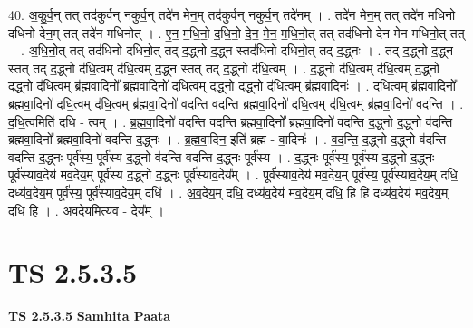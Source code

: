 \documentclass[17pt]{extarticle}
\begin{document}
40. अ॒कु॒र्व॒न् तत् तद॑कुर्वन् नकुर्व॒न् तदे॑न मेन॒म् तद॑कुर्वन् नकुर्व॒न् तदे॑नम् । . तदे॑न मेन॒म् तत् तदे॑न मधिनो दधिनो देन॒म् तत् तदे॑न मधिनोत् । . ए॒न॒ म॒धि॒नो॒ द॒धि॒नो॒ दे॒न॒ मे॒न॒ म॒धि॒नो॒त् तत् तद॑धिनो देन मेन मधिनो॒त् तत् । . अ॒धि॒नो॒त् तत् तद॑धिनो दधिनो॒त् तद् द॒द्ध्नो द॒द्ध्न स्तद॑धिनो दधिनो॒त् तद् द॒द्ध्नः । . तद् द॒द्ध्नो द॒द्ध्न स्तत् तद् द॒द्ध्नो द॑धि॒त्वम् द॑धि॒त्वम् द॒द्ध्न स्तत् तद् द॒द्ध्नो द॑धि॒त्वम् । . द॒द्ध्नो द॑धि॒त्वम् द॑धि॒त्वम् द॒द्ध्नो द॒द्ध्नो द॑धि॒त्वम् ब्र॑ह्मवा॒दिनो᳚ ब्रह्मवा॒दिनो॑ दधि॒त्वम् द॒द्ध्नो द॒द्ध्नो द॑धि॒त्वम् ब्र॑ह्मवा॒दिनः॑ । . द॒धि॒त्वम् ब्र॑ह्मवा॒दिनो᳚ ब्रह्मवा॒दिनो॑ दधि॒त्वम् द॑धि॒त्वम् ब्र॑ह्मवा॒दिनो॑ वदन्ति वदन्ति ब्रह्मवा॒दिनो॑ दधि॒त्वम् द॑धि॒त्वम् ब्र॑ह्मवा॒दिनो॑ वदन्ति । . द॒धि॒त्वमिति॑ दधि - त्वम् । . ब्र॒ह्म॒वा॒दिनो॑ वदन्ति वदन्ति ब्रह्मवा॒दिनो᳚ ब्रह्मवा॒दिनो॑ वदन्ति द॒द्ध्नो द॒द्ध्नो व॑दन्ति ब्रह्मवा॒दिनो᳚ ब्रह्मवा॒दिनो॑ वदन्ति द॒द्ध्नः । . ब्र॒ह्म॒वा॒दिन॒ इति॑ ब्रह्म - वा॒दिनः॑ । . व॒द॒न्ति॒ द॒द्ध्नो द॒द्ध्नो व॑दन्ति वदन्ति द॒द्ध्नः पूर्व॑स्य॒ पूर्व॑स्य द॒द्ध्नो व॑दन्ति वदन्ति द॒द्ध्नः पूर्व॑स्य । . द॒द्ध्नः पूर्व॑स्य॒ पूर्व॑स्य द॒द्ध्नो द॒द्ध्नः पूर्व॑स्याव॒देय॑ मव॒देय॒म् पूर्व॑स्य द॒द्ध्नो द॒द्ध्नः पूर्व॑स्याव॒देय᳚म् । . पूर्व॑स्याव॒देय॑ मव॒देय॒म् पूर्व॑स्य॒ पूर्व॑स्याव॒देय॒म् दधि॒ दध्य॑व॒देय॒म् पूर्व॑स्य॒ पूर्व॑स्याव॒देय॒म् दधि॑ । . अ॒व॒देय॒म् दधि॒ दध्य॑व॒देय॑ मव॒देय॒म् दधि॒ हि हि दध्य॑व॒देय॑ मव॒देय॒म् दधि॒ हि । . अ॒व॒देय॒मित्य॑व - देय᳚म् । \newline
\pagebreak
{}
\section*{ TS 2.5.3.5 }

\textbf{TS 2.5.3.5 } \newline
\textbf{Samhita Paata} \newline
\end{document}
